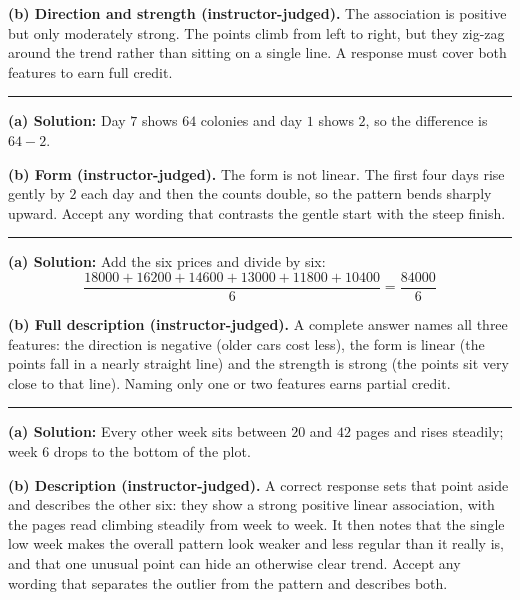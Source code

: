 \documentclass[12pt]{article}
\begin{document}
\textbf{(b) Direction and strength (instructor-judged).} The association is positive but only
moderately strong. The points climb from left to right, but they zig-zag around the trend rather
than sitting on a single line. A response must cover both features to earn full credit.

\vspace{0.2cm}

\noindent\rule{\linewidth}{0.2pt}


\textbf{(a) Solution:} \quad Day $7$ shows $64$ colonies and day $1$ shows $2$, so the difference
is $64 - 2$. 

\textbf{(b) Form (instructor-judged).} The form is not linear. The first four days rise gently by
$2$ each day and then the counts double, so the pattern bends sharply upward. Accept any wording
that contrasts the gentle start with the steep finish.

\vspace{0.2cm}

\noindent\rule{\linewidth}{0.2pt}


\textbf{(a) Solution:} \quad Add the six prices and divide by six:
\[ \frac{18000 + 16200 + 14600 + 13000 + 11800 + 10400}{6} = \frac{84000}{6} \]

\textbf{(b) Full description (instructor-judged).} A complete answer names all three features:
the direction is negative (older cars cost less), the form is linear (the points fall in a nearly
straight line) and the strength is strong (the points sit very close to that line). Naming only
one or two features earns partial credit.

\vspace{0.2cm}

\noindent\rule{\linewidth}{0.2pt}


\textbf{(a) Solution:} \quad Every other week sits between $20$ and $42$ pages and rises steadily;
week $6$ drops to the bottom of the plot. 

\textbf{(b) Description (instructor-judged).} A correct response sets that point aside and
describes the other six: they show a strong positive linear association, with the pages read
climbing steadily from week to week. It then notes that the single low week makes the overall
pattern look weaker and less regular than it really is, and that one unusual point can hide an
otherwise clear trend. Accept any wording that separates the outlier from the pattern and
describes both.
\end{document}
